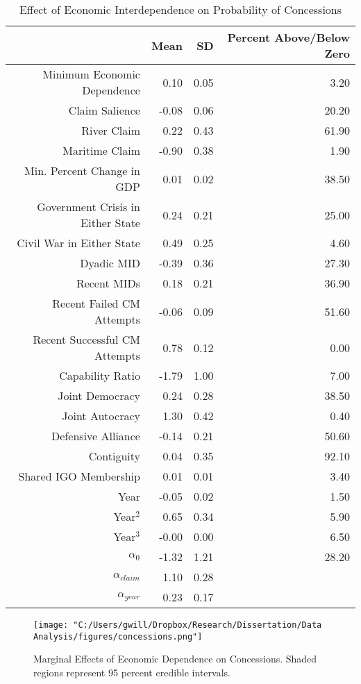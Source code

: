 \begin{table}[ht]
	\caption{Effect of Economic Interdependence on Probability of Concessions}
	\label{tab: concessions}
	\centering
	\begin{tabular}{rrrr}
		\toprule
		& Mean & SD & Percent Above/Below Zero \\ 
		\midrule
		Minimum Economic Dependence & 0.10 & 0.05 & 3.20 \\ 
		Claim Salience & -0.08 & 0.06 & 20.20 \\ 
		River Claim & 0.22 & 0.43 & 61.90 \\ 
		Maritime Claim & -0.90 & 0.38 & 1.90 \\ 
		Min. Percent Change in GDP & 0.01 & 0.02 & 38.50 \\ 
		Government Crisis in Either State & 0.24 & 0.21 & 25.00 \\ 
		Civil War in Either State & 0.49 & 0.25 & 4.60 \\ 
		Dyadic MID & -0.39 & 0.36 & 27.30 \\ 
		Recent MIDs & 0.18 & 0.21 & 36.90 \\ 
		Recent Failed CM Attempts & -0.06 & 0.09 & 51.60 \\ 
		Recent Successful CM Attempts & 0.78 & 0.12 & 0.00 \\ 
		Capability Ratio & -1.79 & 1.00 & 7.00 \\ 
		Joint Democracy & 0.24 & 0.28 & 38.50 \\ 
		Joint Autocracy & 1.30 & 0.42 & 0.40 \\ 
		Defensive Alliance & -0.14 & 0.21 & 50.60 \\ 
		Contiguity & 0.04 & 0.35 & 92.10 \\
		Shared IGO Membership & 0.01 & 0.01 & 3.40 \\ 
		Year & -0.05 & 0.02 & 1.50 \\ 
		Year$^2$ & 0.65 & 0.34 & 5.90 \\ 
		Year$^3$ & -0.00 & 0.00 & 6.50 \\ 
		$\alpha_0$ & -1.32 & 1.21 & 28.20 \\ 
		$\alpha_{claim}$ & 1.10 & 0.28 &  \\ 
		$\alpha_{year}$ & 0.23 & 0.17 &  \\ 
		\bottomrule
	\end{tabular}
	
\end{table}



\begin{figure}

\caption{Marginal Effects of Economic Dependence on Concessions. Shaded regions represent 95 percent credible intervals.}

\label{fig: concessions}

\texttt{[image: "C:/Users/gwill/Dropbox/Research/Dissertation/Data Analysis/figures/concessions.png"]}

\end{figure}

